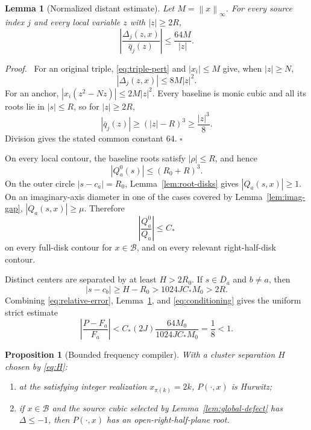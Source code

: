 \documentclass[final,5p,times,twocolumn]{elsarticle}
\newcommand{\abs}[1]{\left|#1\right|}
\newcommand{\norm}[1]{\left\|#1\right\|}
\newtheorem{lemma}[theorem]{Lemma}
\newtheorem{proposition}[theorem]{Proposition}
\newenvironment{proof}[1][Proof]
  {\par\smallskip\noindent\textit{#1.}\ }
  {\hfill$\square$\par\smallskip}
\begin{document}
\begin{lemma}[Normalized distant estimate]\label{lem:distant-infty}
Let $M=\norm{x}_\infty$. For every source index $j$ and every local variable $z$ with $\abs z\ge2R$,
\[
\abs{\frac{\Delta_j(z,x)}{\bar q_j(z)}}
\le\frac{64M}{\abs z}.
\]
\end{lemma}

\begin{proof}
For an original triple, \eqref{eq:triple-pert} and $|x_i|\le M$ give, when $|z|\ge N$,
\[
|\Delta_j(z,x)|\le8M|z|^2.
\]
For an anchor, $|x_i(z^2-Nz)|\le2M|z|^2$. Every baseline is monic cubic and all its roots lie in $|s|\le R$, so for $|z|\ge2R$,
\[
|\bar q_j(z)|\ge(|z|-R)^3\ge\frac{|z|^3}{8}.
\]
Division gives the stated common constant $64$.
\end{proof}

On every local contour, the baseline roots satisfy $|\rho|\le R$, and hence
\[
|Q_a^0(s)|\le(R_0+R)^3.
\]
On the outer circle $|s-c_a|=R_0$, Lemma~\ref{lem:root-disks} gives $|Q_a(s,x)|\ge1$. On an imaginary-axis diameter in one of the cases covered by Lemma~\ref{lem:imag-gap}, $|Q_a(s,x)|\ge\mu$. Therefore
\begin{equation}\label{eq:conditioning}
\abs{\frac{Q_a^0}{Q_a}}\le C_*
\end{equation}
on every full-disk contour for $x\in\mathcal B$, and on every relevant right-half-disk contour.

Distinct centers are separated by at least $H>2R_0$. If $s\in\overline D_a$ and $b\ne a$, then
\[
|s-c_b|\ge H-R_0>1024JC_*M_0>2R.
\]
Combining \eqref{eq:relative-error}, Lemma~\ref{lem:distant-infty}, and \eqref{eq:conditioning} gives the uniform strict estimate
\begin{equation}\label{eq:bounded-rouche}
\abs{\frac{P-F_a}{F_a}}
<C_*(2J)\frac{64M_0}{1024JC_*M_0}
=\frac18<1.
\end{equation}

\begin{proposition}[Bounded frequency compiler]\label{prop:aggregation}
With a cluster separation $H$ chosen by \eqref{eq:H}:
\begin{enumerate}[label=(\roman*)]
\item at the satisfying integer realization $x_{\pi(k)}=2k$, $P(\cdot,x)$ is Hurwitz;
\item if $x\in\mathcal B$ and the source cubic selected by Lemma~\ref{lem:global-defect} has $\Delta\le-1$, then $P(\cdot,x)$ has an open-right-half-plane root.
\end{enumerate}
\end{proposition}
\end{document}
